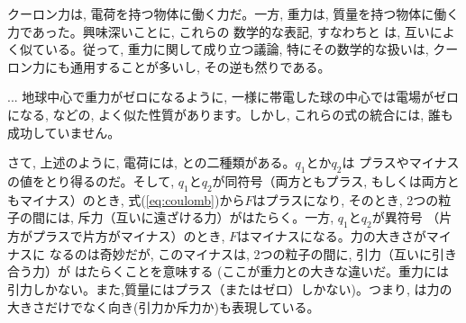 クーロン力は, 電荷を持つ物体に働く力だ。一方, 
重力は, 質量を持つ物体に働く力であった。興味深いことに, これらの
数学的な表記, すなわちと
は, 互いによく似ている。従って, 重力に関して成り立つ議論, 特にその数学的な扱いは, 
クーロン力にも通用することが多いし, その逆も然りである。

\begin{faq}{\small{}
... 地球中心で重力がゼロになるように, 一様に帯電した球の中心では電場がゼロになる, などの, 
よく似た性質があります。しかし, これらの式の統合には, 誰も成功していません。}\end{faq}\mv

さて, 上述のように, 電荷には, との二種類がある。$q_1$とか$q_2$は
プラスやマイナスの値をとり得るのだ。そして, $q_1$と$q_2$が同符号（両方ともプラス, 
もしくは両方ともマイナス）のとき, 式(\ref{eq:coulomb})から$F$はプラスになり, そのとき, 
2つの粒子の間には, 斥力（互いに遠ざける力）がはたらく。一方, $q_1$と$q_2$が異符号
（片方がプラスで片方がマイナス）のとき, $F$はマイナスになる。力の大きさがマイナスに
なるのは奇妙だが, このマイナスは, 2つの粒子の間に, 引力（互いに引き合う力）が
はたらくことを意味する (ここが重力との大きな違いだ。重力には
引力しかない。また,質量にはプラス（またはゼロ）しかない)。つまり, 
は力の大きさだけでなく向き(引力か斥力か)も表現している。

